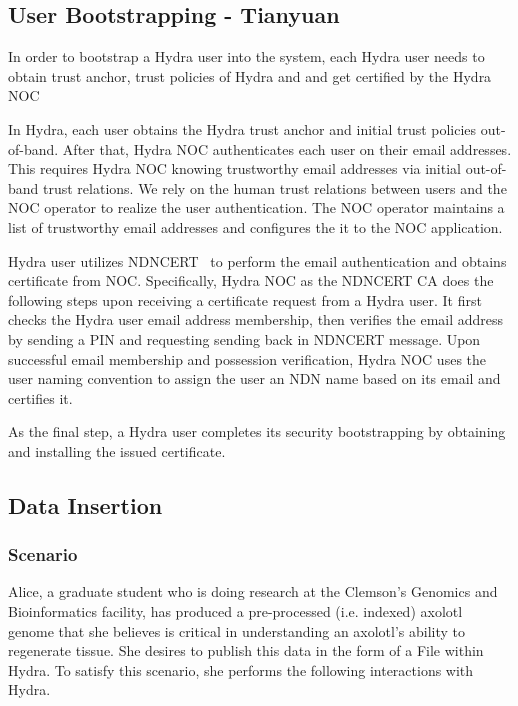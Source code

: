 \subsection{User Bootstrapping - Tianyuan}
\label{sec:dataop-bootstrap}
In order to bootstrap a Hydra user into the system, each Hydra user needs to obtain trust anchor, trust policies of Hydra and and get certified by the Hydra NOC

In Hydra, each user obtains the Hydra trust anchor and initial trust policies out-of-band.
After that, Hydra NOC authenticates each user on their email addresses.
This requires Hydra NOC knowing trustworthy email addresses via initial out-of-band trust relations.
We rely on the human trust relations between users and the NOC operator to realize the user authentication. 
The NOC operator maintains a list of trustworthy email addresses and configures the it to the NOC application.

Hydra user utilizes NDNCERT~\cite{} to perform the email authentication and obtains certificate from NOC.
Specifically, Hydra NOC as the NDNCERT CA does the following steps upon receiving a certificate request from a Hydra user.
It first checks the Hydra user email address membership, then verifies the email address by sending a PIN and requesting sending back in NDNCERT message.
Upon successful email membership and possession verification, Hydra NOC uses the user naming convention to assign the user an NDN name based on its email and certifies it.

As the final step, a Hydra user completes its security bootstrapping by obtaining and installing the issued certificate.

\subsection{Data Insertion} \label{sec:data-insert}

\subsubsection{Scenario}
Alice, a graduate student who is doing research at the Clemson's Genomics and Bioinformatics facility, has produced a pre-processed (i.e. indexed) axolotl genome that she believes is critical in understanding an axolotl's ability to regenerate tissue. She desires to publish this data in the form of a File within Hydra. To satisfy this scenario, she performs the following interactions with Hydra.


